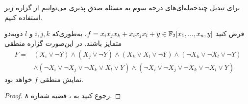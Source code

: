برای تبدیل چندجمله‌ای‌های درجه سوم به مسئله‌ صدق پذیری می‌توانیم از گزاره‌ زیر استفاده کنیم.
\begin{proposition}
\label{CPS conversion}
فرض کنید 
$f = x_{i}x_{j}x_{k} + x_{i}x_{j}x_{l} + y\in \mathbb{F}_{2}[x_{1},...,x_{n},y]$، 
به‌طوری‌که 
$i,j,k$
و
$l$
دو‌به‌دو متمایز باشند. در این‌صورت گزاره منطقی 
\begin{align*}
F =& (X_{i}\vee \neg Y)\wedge (X_{j}\vee \neg Y)\wedge (X_{k}\vee X_{l}\vee \neg Y)\wedge (\neg X_{k}\vee \neg X_{l}\vee \neg Y)\\
&\wedge (\neg X_{i}\vee \neg X_{j}\vee \neg X_{k}\vee X_{l}\vee Y)\wedge (\neg X_{i}\vee \neg X_{j}\vee \neg X_{k}\vee \neg X_{l}\vee Y)
\end{align*}
نمایش منطقی 
$f$
خواهد بود. 
\end{proposition}
\begin{proof}
رجوع کنید به 
\cite{jovanovic2010algebraic}، 
قضیه شماره ۸. 
\end{proof}

